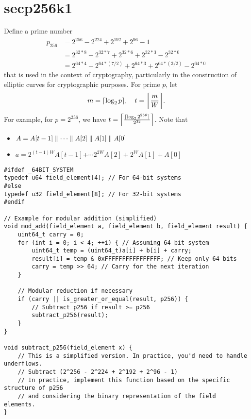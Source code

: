\section{secp256k1}
Define a prime number \begin{align*}
p_{256} &= 2^{256}-2^{224}+2^{192}+2^{96}-1 \\
&=2^{32*8}-2^{32*7}+2^{32*6}+2^{32*3}-2^{32*0}\\
&= 2^{64*4}-2^{64*(7/2)}+2^{64*3}+2^{64*(3/2)}-2^{64*0}
\end{align*} that is used in the context of cryptography, particularly in the construction of elliptic curves for cryptographic purposes.
For prime $p$, let \begin{align*}
	m = \ceil*{\log_2 p},\quad t=\ceil*{\frac{m}{W}}.
\end{align*} For example, for $p=2^{256}$, we have $t=\ceil*{\frac{\ceil{\log_2 2^{256}}}{2^{32}}}$. Note that \begin{itemize}
\item $A = A[t-1]\adjacent\cdots\adjacent A[2]\adjacent A[1]\adjacent A[0]$
\item $a = 2^{(t-1)W}A[t-1]$+$\cdots 2^{2W}A[2]+2^{W}A[1]+A[0]$
\end{itemize}

\newpage

\vspace{4pt}
\begin{lstlisting}[style=C]
#ifdef _64BIT_SYSTEM
typedef u64 field_element[4]; // For 64-bit systems
#else
typedef u32 field_element[8]; // For 32-bit systems
#endif

// Example for modular addition (simplified)
void mod_add(field_element a, field_element b, field_element result) {
	uint64_t carry = 0;
	for (int i = 0; i < 4; ++i) { // Assuming 64-bit system
		uint64_t temp = (uint64_t)a[i] + b[i] + carry;
		result[i] = temp & 0xFFFFFFFFFFFFFFFF; // Keep only 64 bits
		carry = temp >> 64; // Carry for the next iteration
	}
	
	// Modular reduction if necessary
	if (carry || is_greater_or_equal(result, p256)) {
		// Subtract p256 if result >= p256
		subtract_p256(result);
	}
}

void subtract_p256(field_element x) {
	// This is a simplified version. In practice, you'd need to handle underflows.
	// Subtract (2^256 - 2^224 + 2^192 + 2^96 - 1)
	// In practice, implement this function based on the specific structure of p256
	// and considering the binary representation of the field elements.
}
\end{lstlisting}

